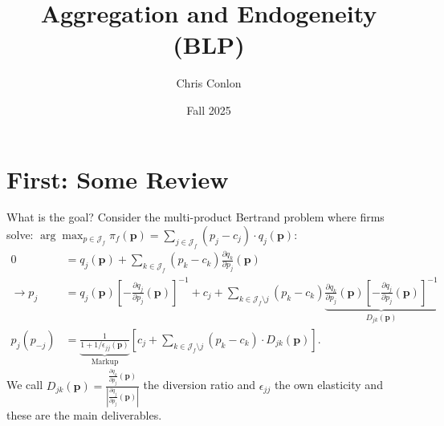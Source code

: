 



\newcommand{\vect}[1]{\boldsymbol{\mathbf{#1}}}
\newcommand{\pd}[2]{\frac{\partial{#1}}{\partial{#2}}}
\newcommand{\expect}[2]{\mathbb{E}_{#1}\left[{#2}\right]}
\newcommand{\expectsmall}[2]{\mathbb{E}_{#1}{#2}}
\newcommand{\expectsuper}[3]{\mathbb{E}_{#1}^{#2}\left[{#3}\right]}
\newcommand{\ind}[1]{\mathbbm{1}\left\{{#1}\right\}}
\newcommand{\prob}[1]{\mathbb{P}\left\{{#1}\right\}}
\newcommand{\derivative}[2]{\frac{d{#2}}{d{#1}}}
\newcommand{\cat}[1]{\citeasnoun{#1}}

\title{Aggregation and Endogeneity (BLP)}
\author{Chris Conlon}

\date{Fall 2025}








\begin{frame}[plain] %
\titlepage
\end{frame}


\section{First: Some Review}

\begin{frame}{What is the goal?}
\small
Consider the multi-product Bertrand problem where firms solve: $\arg \max_{p \in \mathcal{J}_f} \pi_f (\mathbf{p}) = \sum_{j \in \mathcal{J}_f} (p_j - c_j) \cdot q_j(\mathbf{p})$:
\begin{align*}
 0&= q_j(\mathbf{p}) + \sum_{k \in \mathcal{J}_f} (p_k - c_k) \frac{\partial q_{k}}{\partial p_j}(\mathbf{p}) \\
\rightarrow p_j &=q_{j}(\mathbf{p}) \left[-\frac{\partial q_{j}}{\partial p_{j}}(\mathbf{p})\right]^{-1} + c_{j} + \sum_{k \in \mathcal{J}_{f} \setminus j} \left(p_{k}-c_{k}\right) \underbrace{\frac{\partial q_{k}}{\partial p_{j}}(\mathbf{p})\left[-\frac{\partial q_{j}}{\partial p_{j}}(\mathbf{p})\right]^{-1}}_{D_{jk}(\mathbf{p})}\\
p_j(p_{-j}) &= \underbrace{\frac{1}{1+1/\epsilon_{jj}(\mathbf{p})}}_{\text{Markup}} \left[ c_j + \sum_{k \in \mathcal{J}_{f} \setminus j}  (p_k-c_k) \cdot  D_{jk} (\mathbf{p}) \right].
\end{align*}
We call $D_{jk}(\mathbf{p}) = \frac{\frac{\partial q_{k}}{\partial p_j}(\mathbf{p})}{\left| \frac{\partial q_{j}}{\partial p_j}(\mathbf{p}) \right|}$ the \alert{diversion ratio} and $\epsilon_{jj}$ the \alert{own elasticity} and these are the main deliverables.
\end{frame}

